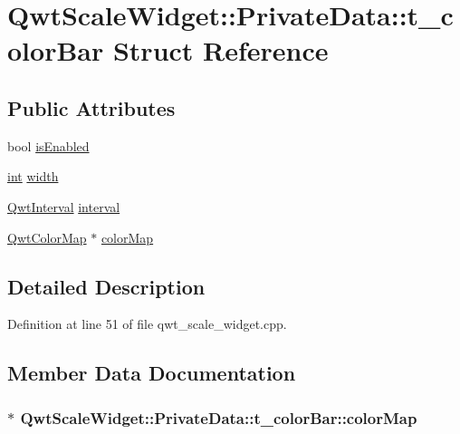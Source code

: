 \hypertarget{struct_qwt_scale_widget_1_1_private_data_1_1t__color_bar}{\section{Qwt\-Scale\-Widget\-:\-:Private\-Data\-:\-:t\-\_\-color\-Bar Struct Reference}
\label{struct_qwt_scale_widget_1_1_private_data_1_1t__color_bar}
}
\subsection*{Public Attributes}
\begin{DoxyCompactItemize}
\item 
bool \hyperlink{struct_qwt_scale_widget_1_1_private_data_1_1t__color_bar_adeebf948ce41ae1fc7aa9033b9012cba}{is\-Enabled}
\item 
\hyperlink{ioapi_8h_a787fa3cf048117ba7123753c1e74fcd6}{int} \hyperlink{struct_qwt_scale_widget_1_1_private_data_1_1t__color_bar_a31caea5a9c042201cc14dc86197ce281}{width}
\item 
\hyperlink{class_qwt_interval}{Qwt\-Interval} \hyperlink{struct_qwt_scale_widget_1_1_private_data_1_1t__color_bar_a1adf56cd6200452a27d30082c297a55b}{interval}
\item 
\hyperlink{class_qwt_color_map}{Qwt\-Color\-Map} $\ast$ \hyperlink{struct_qwt_scale_widget_1_1_private_data_1_1t__color_bar_a6efdd7664167e9618aa85b58b5f933ce}{color\-Map}
\end{DoxyCompactItemize}


\subsection{Detailed Description}


Definition at line 51 of file qwt\-\_\-scale\-\_\-widget.\-cpp.



\subsection{Member Data Documentation}
\hypertarget{struct_qwt_scale_widget_1_1_private_data_1_1t__color_bar_a6efdd7664167e9618aa85b58b5f933ce}{
\subsubsection[{color\-Map}]{$\ast$ Qwt\-Scale\-Widget\-::\-Private\-Data\-::t\-\_\-color\-Bar\-::color\-Map}}\label{struct_qwt_scale_widget_1_1_private_data_1_1t__color_bar_a6efdd7664167e9618aa85b58b5f933ce}


